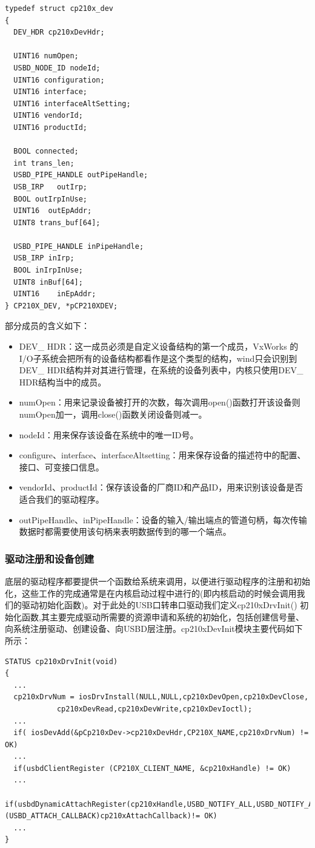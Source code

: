 \lstset{language=C}
\begin{lstlisting}
typedef struct cp210x_dev
{
  DEV_HDR cp210xDevHdr; 
  
  UINT16 numOpen;
  USBD_NODE_ID nodeId;
  UINT16 configuration;	
  UINT16 interface; 
  UINT16 interfaceAltSetting;
  UINT16 vendorId;
  UINT16 productId;

  BOOL connected;  
  int trans_len;
  USBD_PIPE_HANDLE outPipeHandle; 
  USB_IRP	outIrp; 
  BOOL outIrpInUse; 
  UINT16  outEpAddr;
  UINT8 trans_buf[64];

  USBD_PIPE_HANDLE inPipeHandle;
  USB_IRP inIrp;
  BOOL inIrpInUse;
  UINT8 inBuf[64];
  UINT16 	inEpAddr;
} CP210X_DEV, *pCP210XDEV;
\end{lstlisting}
\noindent 部分成员的含义如下：

\begin{itemize}
\item DEV\_ HDR：这一成员必须是自定义设备结构的第一个成员，VxWorks 的I/O子系统会把所有的设备结构都看作是这个类型的结构，wind只会识别到DEV\_ HDR结构并对其进行管理，在系统的设备列表中，内核只使用DEV\_ HDR结构当中的成员。
\item numOpen：用来记录设备被打开的次数，每次调用open()函数打开该设备则numOpen加一，调用close()函数关闭设备则减一。
\item nodeId：用来保存该设备在系统中的唯一ID号。
\item configure、interface、interfaceAltsetting：用来保存设备的描述符中的配置、接口、可变接口信息。
\item vendorId、productId：保存该设备的厂商ID和产品ID，用来识别该设备是否适合我们的驱动程序。
\item outPipeHandle、inPipeHandle：设备的输入/输出端点的管道句柄，每次传输数据时都需要使用该句柄来表明数据传到的哪一个端点。
\end{itemize}






\subsubsection{驱动注册和设备创建} 
	
	底层的驱动程序都要提供一个函数给系统来调用，以便进行驱动程序的注册和初始化，这些工作的完成通常是在内核启动过程中进行的(即内核启动的时候会调用我们的驱动初始化函数)。对于此处的USB口转串口驱动我们定义cp210xDrvInit() 初始化函数,其主要完成驱动所需要的资源申请和系统的初始化，包括创建信号量、向系统注册驱动、创建设备、向USBD层注册。cp210xDevInit模块主要代码如下所示：
\lstset{language=C}
\begin{lstlisting}
STATUS cp210xDrvInit(void)
{
  ... 	
  cp210xDrvNum = iosDrvInstall(NULL,NULL,cp210xDevOpen,cp210xDevClose,
			cp210xDevRead,cp210xDevWrite,cp210xDevIoctl);
  ...
  if( iosDevAdd(&pCp210xDev->cp210xDevHdr,CP210X_NAME,cp210xDrvNum) != OK)
  ...  
  if(usbdClientRegister (CP210X_CLIENT_NAME, &cp210xHandle) != OK)
  ...  
  if(usbdDynamicAttachRegister(cp210xHandle,USBD_NOTIFY_ALL,USBD_NOTIFY_ALL,USBD_NOTIFY_ALL,TRUE,(USBD_ATTACH_CALLBACK)cp210xAttachCallback)!= OK)
  ...
}
\end{lstlisting}\\

